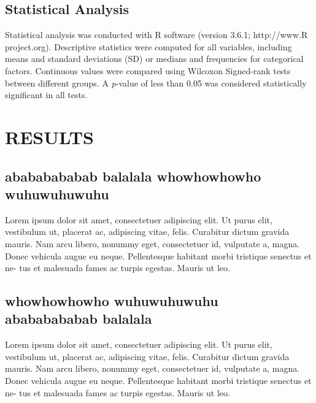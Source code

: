 \subsection{Statistical Analysis} %

Statistical analysis was conducted with R software (version 3.6.1; http://www.R\\project.org). Descriptive statistics were computed for all variables, including means and standard deviations (SD) or medians and frequencies for categorical factors. Continuous values were compared using Wilcoxon Signed-rank tests between different groups. A \textit{p}-value of less than 0.05 was considered statistically significant in all tests.

\section{RESULTS} %
\subsection{abababababab balalala whowhowhowho wuhuwuhuwuhu} %

Lorem ipsum dolor sit amet, consectetuer adipiscing elit. Ut purus elit, vestibulum ut, placerat ac, adipiscing vitae, felis. Curabitur dictum gravida mauris. Nam arcu libero, nonummy eget, consectetuer id, vulputate a, magna. Donec vehicula augue eu neque. Pellentesque habitant morbi tristique senectus et ne-
tus et malesuada fames ac turpis egestas. Mauris ut leo.

\subsection{whowhowhowho wuhuwuhuwuhu abababababab balalala } %

Lorem ipsum dolor sit amet, consectetuer adipiscing elit. Ut purus elit, vestibulum ut, placerat ac, adipiscing vitae, felis. Curabitur dictum gravida mauris. Nam arcu libero, nonummy eget, consectetuer id, vulputate a, magna. Donec vehicula augue eu neque. Pellentesque habitant morbi tristique senectus et ne-
tus et malesuada fames ac turpis egestas. Mauris ut leo.


